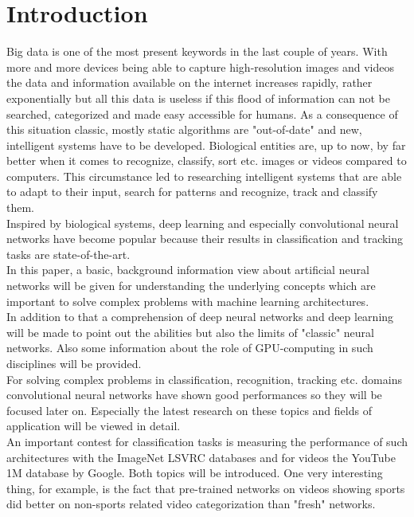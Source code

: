 \documentclass[12pt,twoside]{article}
\theoremstyle{plain}
\theoremstyle{definition}
\theoremstyle{remark}
\begin{document}






\section{Introduction}
\label{sec:introduction}

Big data is one of the most present keywords in the last couple of years. With more and more devices being able to capture high-resolution images and videos the data and information available on the internet increases rapidly, rather exponentially but all this data is useless if this flood of information can not be searched, categorized and made easy accessible for humans. As a consequence of this situation classic, mostly static algorithms are "out-of-date" and new, intelligent systems have to be developed. Biological entities are, up to now, by far better when it comes to recognize, classify, sort etc. images or videos compared to computers. This circumstance led to researching intelligent systems that are able to adapt to their input, search for patterns and recognize, track and classify them.
\\
Inspired by biological systems, deep learning and especially convolutional neural networks have become popular because their results in classification and tracking tasks are state-of-the-art.
\\
In this paper, a basic, background information view about artificial neural networks will be given for understanding the underlying concepts which are important to solve complex problems with machine learning architectures.
\\
In addition to that a comprehension of deep neural networks and deep learning will be made to point out the abilities but also the limits of "classic" neural networks. Also some information about the role of GPU-computing in such disciplines will be provided.
\\
For solving complex problems in classification, recognition, tracking etc. domains convolutional neural networks have shown good performances so they will be focused later on. Especially the latest research on these topics and fields of application will be viewed in detail.
\\
An important contest for classification tasks is measuring the performance of such architectures with the ImageNet LSVRC databases and for videos the YouTube 1M database by Google. Both topics will be introduced. One very interesting thing, for example, is the fact that pre-trained networks on videos showing sports did better on non-sports related video categorization than "fresh" networks.
\end{document}
